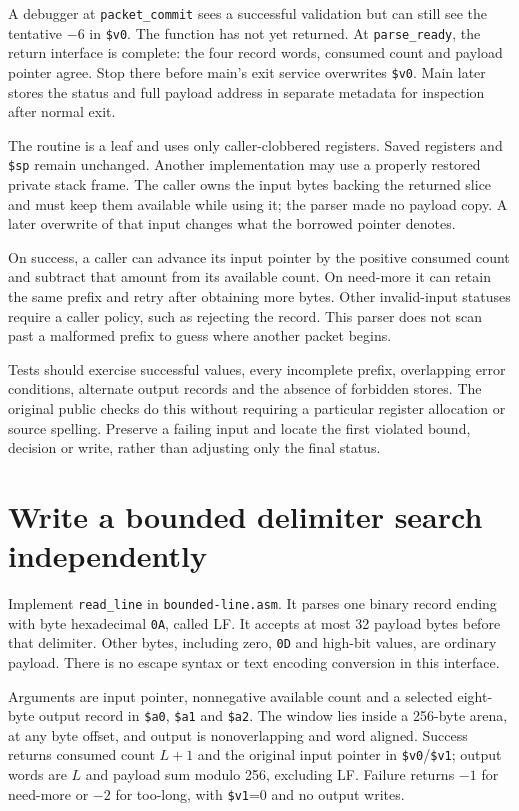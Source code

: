 A debugger at \texttt{packet\_commit} sees a successful validation but can still
see the tentative $-6$ in \texttt{\$v0}. The function has not yet returned.
At \texttt{parse\_ready}, the return interface is complete: the four record words,
consumed count and payload pointer agree. Stop there before main's exit service
overwrites \texttt{\$v0}. Main later stores the status and full payload address
in separate metadata for inspection after normal exit.

The routine is a leaf and uses only caller-clobbered registers. Saved registers
and \texttt{\$sp} remain unchanged. Another implementation may use a properly
restored private stack frame. The caller owns the input bytes backing the returned
slice and must keep them available while using it; the parser made no payload copy.
A later overwrite of that input changes what the borrowed pointer denotes.

On success, a caller can advance its input pointer by the positive consumed count
and subtract that amount from its available count. On need-more it can retain the
same prefix and retry after obtaining more bytes. Other invalid-input statuses
require a caller policy, such as rejecting the record. This parser does not scan
past a malformed prefix to guess where another packet begins.

Tests should exercise successful values, every incomplete prefix, overlapping
error conditions, alternate output records and the absence of forbidden stores.
The original public checks do this without requiring a particular register
allocation or source spelling. Preserve a failing input and locate the first
violated bound, decision or write, rather than adjusting only the final status.

\section{Write a bounded delimiter search independently}

Implement \texttt{read\_line} in \texttt{bounded-line.asm}. It parses one binary
record ending with byte hexadecimal \texttt{0A}, called LF. It accepts at most
32 payload bytes before that delimiter. Other bytes, including zero, \texttt{0D}
and high-bit values, are ordinary payload. There is no escape syntax or text
encoding conversion in this interface.

Arguments are input pointer, nonnegative available count and a selected eight-byte
output record in \texttt{\$a0}, \texttt{\$a1} and \texttt{\$a2}. The window lies
inside a 256-byte arena, at any byte offset, and output is nonoverlapping and word
aligned. Success returns consumed count $L+1$ and the original input pointer in
\texttt{\$v0}/\texttt{\$v1}; output words are $L$ and payload sum modulo 256,
excluding LF. Failure returns $-1$ for need-more or $-2$ for too-long, with
\texttt{\$v1}=0 and no output writes.

